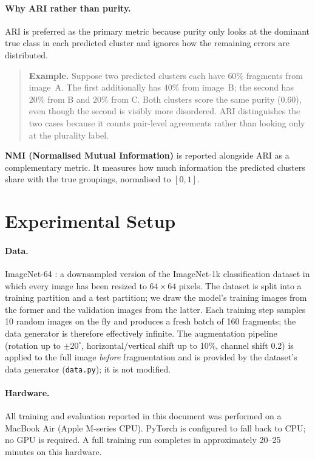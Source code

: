 \documentclass[12pt, a4paper]{article}
\begin{document}
\paragraph{Why ARI rather than purity.}
ARI is preferred as the primary metric because purity only looks at the
dominant true class in each predicted cluster and ignores how the remaining
errors are distributed.

\begin{quote}\small
\textbf{Example.} Suppose two predicted clusters each have $60\%$ fragments
from image~A. The first additionally has $40\%$ from image~B; the second has $20\%$
from B and $20\%$ from C. Both clusters score the same purity (0.60), even though
the second is visibly more disordered. ARI distinguishes the two cases because it
counts pair-level agreements rather than looking only at the plurality label.
\end{quote}

\textbf{NMI (Normalised Mutual Information)} is reported alongside ARI as a
complementary metric. It measures how much information the predicted clusters share
with the true groupings, normalised to $[0, 1]$.

\section{Experimental Setup}

\paragraph{Data.}
ImageNet-64 \parencite{imagenet64}: a downsampled version of the ImageNet-1k
classification dataset in which every image has been resized to $64 \times 64$
pixels. The dataset is split into a training partition and a test partition; we draw
the model's training images from the former and the validation images from the
latter. Each training step samples 10 random images on the fly and produces a fresh
batch of 160 fragments; the data generator is therefore effectively infinite. The
augmentation pipeline (rotation up to $\pm 20^\circ$, horizontal/vertical shift up
to 10\%, channel shift 0.2) is applied to the full image \emph{before} fragmentation
and is provided by the dataset's data generator (\texttt{data.py}); it is not
modified.

\paragraph{Hardware.}
All training and evaluation reported in this document was performed on a MacBook Air
(Apple M-series CPU). PyTorch is configured to fall back to CPU; no GPU is required.
A full training run completes in approximately 20--25 minutes on this hardware.
\end{document}
